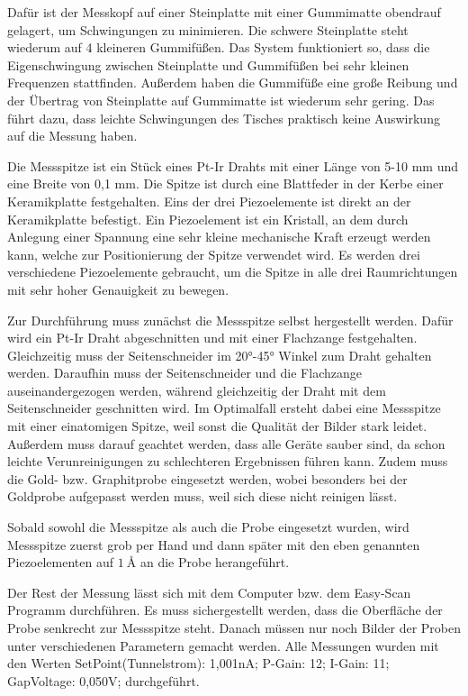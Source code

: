 \documentclass[
	a4paper,
	12pt,
	pagesize,
	ngerman
]{scrartcl}
\begin{document}
Dafür ist der Messkopf auf einer Steinplatte mit einer Gummimatte obendrauf gelagert, um Schwingungen zu minimieren. Die schwere Steinplatte steht wiederum auf 4 kleineren Gummifüßen. 
Das System funktioniert so, dass die Eigenschwingung zwischen Steinplatte und Gummifüßen bei sehr kleinen Frequenzen stattfinden. Außerdem haben die Gummifüße eine große Reibung und der Übertrag von Steinplatte auf Gummimatte ist wiederum sehr gering. Das führt dazu, dass leichte Schwingungen des Tisches praktisch keine Auswirkung auf die Messung haben.

Die Messspitze ist ein Stück eines Pt-Ir Drahts mit einer Länge von 5-10 mm und eine Breite von 0,1 mm. Die Spitze ist durch eine Blattfeder in der Kerbe einer Keramikplatte festgehalten. Eins der drei Piezoelemente ist direkt an der Keramikplatte befestigt. Ein Piezoelement ist ein Kristall, an dem durch Anlegung einer Spannung eine sehr kleine mechanische Kraft erzeugt werden kann, welche zur Positionierung der Spitze verwendet wird. Es werden drei verschiedene Piezoelemente gebraucht, um die Spitze in alle drei Raumrichtungen mit sehr hoher Genauigkeit zu bewegen.

Zur Durchführung muss zunächst die Messspitze selbst hergestellt werden. Dafür wird ein Pt-Ir Draht abgeschnitten und mit einer Flachzange festgehalten. Gleichzeitig muss der Seitenschneider im 20°-45° Winkel zum Draht gehalten werden. Daraufhin muss der Seitenschneider und die Flachzange auseinandergezogen werden, während gleichzeitig der Draht mit dem Seitenschneider geschnitten wird. Im Optimalfall ersteht dabei eine Messspitze mit einer einatomigen Spitze, weil sonst die Qualität der Bilder stark leidet. Außerdem muss darauf geachtet werden, dass alle Geräte sauber sind, da schon leichte Verunreinigungen zu schlechteren Ergebnissen führen kann. Zudem muss die Gold- bzw. Graphitprobe eingesetzt werden, wobei besonders bei der Goldprobe aufgepasst werden muss, weil sich diese nicht reinigen lässt.


Sobald sowohl die Messspitze als auch die Probe eingesetzt wurden, wird Messspitze zuerst grob per Hand und dann später mit den eben genannten Piezoelementen auf $\SI{1}{\angstrom}$ an die Probe herangeführt. 

Der Rest der Messung lässt sich mit dem Computer bzw. dem Easy-Scan Programm durchführen. Es muss sichergestellt werden, dass die Oberfläche der Probe senkrecht zur Messspitze steht. Danach müssen nur noch Bilder der Proben unter verschiedenen Parametern gemacht werden. 
Alle Messungen wurden mit den Werten SetPoint(Tunnelstrom): 1,001nA; P-Gain: 12;
I-Gain: 11; GapVoltage: 0,050V; durchgeführt.
\end{document}

